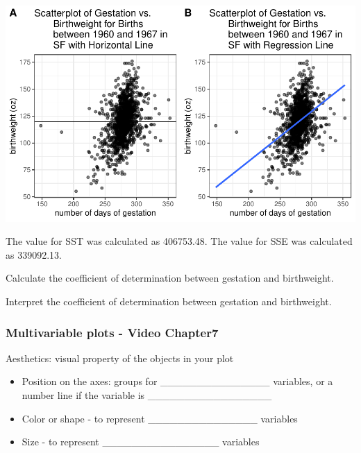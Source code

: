 \documentclass[
]{report}
\begin{document}

\begin{center}\includegraphics[width=0.7\linewidth]{13-VN13-regression_files/figure-latex/unnamed-chunk-6-1} \end{center}

The value for SST was calculated as 406753.48. The value for SSE was calculated as 339092.13.

Calculate the coefficient of determination between gestation and birthweight.

\vspace{0.3in}

Interpret the coefficient of determination between gestation and birthweight.

\vspace{0.5in}

\newpage

\subsubsection*{Multivariable plots - Video Chapter7}\label{multivariable-plots---video-chapter7}

Aesthetics: visual property of the objects in your plot


\begin{itemize}
\item
  Position on the axes: groups for \_\_\_\_\_\_\_\_\_\_\_\_\_\_\_ variables, or a number line if the variable is \_\_\_\_\_\_\_\_\_\_\_\_\_\_\_\_\_
\item
  Color or shape - to represent \_\_\_\_\_\_\_\_\_\_\_\_\_\_\_ variables
\item
  Size - to represent \_\_\_\_\_\_\_\_\_\_\_\_\_\_\_\_ variables
\end{itemize}

\end{document}
